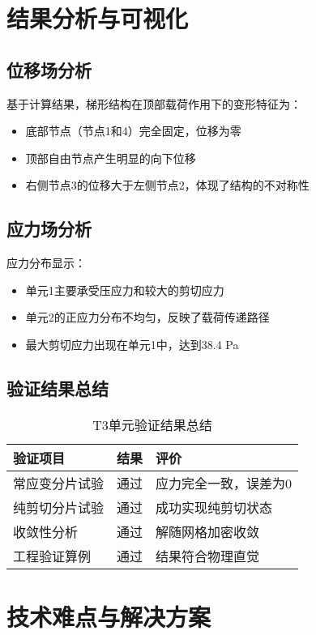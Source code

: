 \documentclass[12pt,a4paper]{article}
\begin{document}
\section{结果分析与可视化}

\subsection{位移场分析}

基于计算结果，梯形结构在顶部载荷作用下的变形特征为：
\begin{itemize}
    \item 底部节点（节点1和4）完全固定，位移为零
    \item 顶部自由节点产生明显的向下位移
    \item 右侧节点3的位移大于左侧节点2，体现了结构的不对称性
\end{itemize}

\subsection{应力场分析}

应力分布显示：
\begin{itemize}
    \item 单元1主要承受压应力和较大的剪切应力
    \item 单元2的正应力分布不均匀，反映了载荷传递路径
    \item 最大剪切应力出现在单元1中，达到38.4 Pa
\end{itemize}

\subsection{验证结果总结}

\begin{table}[H]
\centering
\caption{T3单元验证结果总结}
\begin{tabular}{lcl}
\toprule
验证项目 & 结果 & 评价 \\
\midrule
常应变分片试验 & 通过 & 应力完全一致，误差为0 \\
纯剪切分片试验 & 通过 & 成功实现纯剪切状态 \\
收敛性分析 & 通过 & 解随网格加密收敛 \\
工程验证算例 & 通过 & 结果符合物理直觉 \\
\bottomrule
\end{tabular}
\end{table}

\section{技术难点与解决方案}
\end{document}
